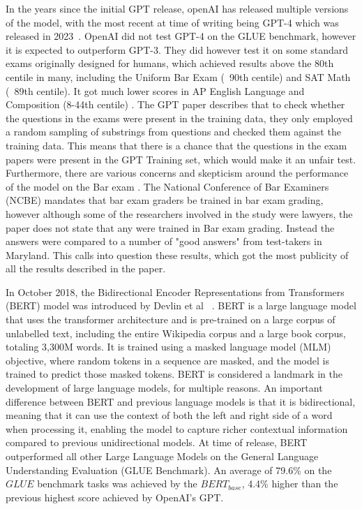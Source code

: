 \documentclass{UoYCSproject}
\begin{document}
    \par

    In the years since the initial GPT release, openAI has released multiple versions of the model, with the most recent at time of writing being GPT-4 which was released in 2023~\cite{openai2024gpt4}.
    OpenAI did not test GPT-4 on the GLUE benchmark, however it is expected to outperform GPT-3.
    They did however test it on some standard exams originally designed for humans, which achieved results above the 80th centile in many, including the Uniform Bar Exam (~90th centile) and SAT Math (~89th centile). It got much lower scores in AP English Language and Composition (8-44th centile)  \cite{openai2024gpt4}.
    The GPT paper describes that to check whether the questions in the exams were present in the training data, they only employed a random sampling of substrings from questions and checked them against the training data.
    This means that there is a chance that the questions in the exam papers were present in the GPT Training set, which would make it an unfair test.
    Furthermore, there are various concerns and skepticism around the performance of the model on the Bar exam \cite{Sullivan2024-bk, EvalBarGPT}.
    The National Conference of Bar Examiners (NCBE) mandates that bar exam graders be trained in bar exam grading, however although some of the researchers involved in the study were lawyers, the paper does not state that any were trained in Bar exam grading.
    Instead the answers were compared to a number of "good answers" from test-takers in Maryland.
    This calls into question these results, which got the most publicity of all the results described in the paper. \par

    \par

    In October 2018, the Bidirectional Encoder Representations from Transformers (BERT) model was introduced by Devlin et al~\cite{devlin2019bert} .
    BERT is a large language model that uses the transformer architecture and is pre-trained on a large corpus of unlabelled text, including the entire Wikipedia corpus and a large book corpus, totaling 3,300M words.
    It is trained using a masked language model (MLM) objective, where random tokens in a sequence are masked, and the model is trained to predict those masked tokens.
    BERT is considered a landmark in the development of large language models, for multiple reasons.
    An important difference between BERT and previous language models is that it is bidirectional, meaning that it can
    use the context of both the left and right side of a word when processing it, enabling the model to capture richer contextual information compared to previous unidirectional models.
    At time of release, BERT outperformed all other Large Language Models on the General Language Understanding Evaluation (GLUE Benchmark).
    An average of 79.6\% on the $GLUE$ benchmark tasks was achieved by the $BERT_{base}$, 4.4\% higher than the previous highest score achieved by OpenAI's GPT.
\end{document}
